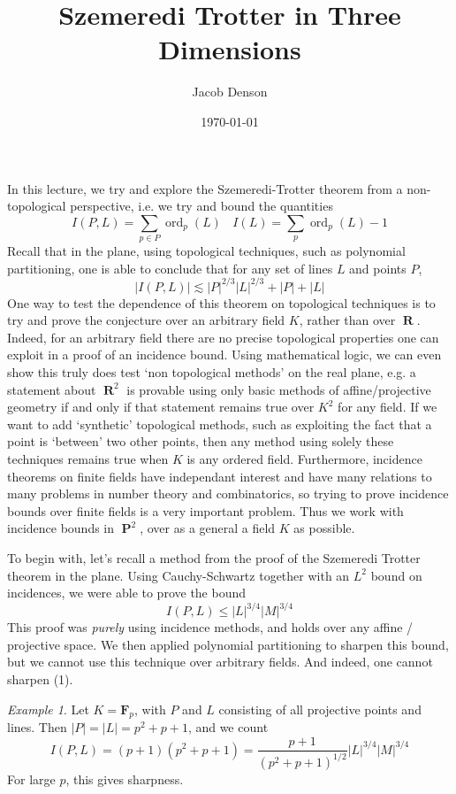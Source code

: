 \documentclass{article}
\title{Szemeredi Trotter in Three Dimensions}
\author{Jacob Denson}
\date{\today}
\theoremstyle{plain}
\theoremstyle{remark}
\newtheorem*{example}{Example}
\theoremstyle{definition}
\DeclareMathOperator{\RR}{\mathbf{R}}
\DeclareMathOperator{\PP}{\mathbf{P}}
\DeclareMathOperator{\ord}{\text{ord}}
\begin{document}
\maketitle

In this lecture, we try and explore the Szemeredi-Trotter theorem from a non-topological perspective, i.e. we try and bound the quantities
%
\[ I(P,L) = \sum_{p \in P} \ord_p(L)\ \ \ \ I(L) = \sum_p \ord_p(L) - 1 \]
%
Recall that in the plane, using topological techniques, such as polynomial partitioning, one is able to conclude that for any set of lines $L$ and points $P$,
%
\[ |I(P,L)| \lesssim |P|^{2/3} |L|^{2/3} + |P| + |L| \]
%
One way to test the dependence of this theorem on topological techniques is to try and prove the conjecture over an arbitrary field $K$, rather than over $\RR$. Indeed, for an arbitrary field there are no precise topological properties one can exploit in a proof of an incidence bound. Using mathematical logic, we can even show this truly does test `non topological methods' on the real plane, e.g. a statement about $\RR^2$ is provable using only basic methods of affine/projective geometry if and only if that statement remains true over $K^2$ for any field. If we want to add `synthetic' topological methods, such as exploiting the fact that a point is `between' two other points, then any method using solely these techniques remains true when $K$ is any ordered field. Furthermore, incidence theorems on finite fields have independant interest and have many relations to many problems in number theory and combinatorics, so trying to prove incidence bounds over finite fields is a very important problem. Thus we work with incidence bounds in $\PP^2$, over as a general a field $K$ as possible.

To begin with, let's recall a method from the proof of the Szemeredi Trotter theorem in the plane. Using Cauchy-Schwartz together with an $L^2$ bound on incidences, we were able to prove the bound
%
\begin{equation} I(P,L) \leq |L|^{3/4} |M|^{3/4} \end{equation}
%
This proof was {\it purely} using incidence methods, and holds over any affine / projective space. We then applied polynomial partitioning to sharpen this bound, but we cannot use this technique over arbitrary fields. And indeed, one cannot sharpen (1).

\begin{example}
    Let $K = \mathbf{F}_p$, with $P$ and $L$ consisting of all projective points and lines. Then $|P| = |L| = p^2 + p+1$, and we count
    \[ I(P,L) = (p+1)(p^2+p+1) = \frac{p+1}{(p^2 + p + 1)^{1/2}} |L|^{3/4} |M|^{3/4} \]
    For large $p$, this gives sharpness.
\end{example}
\end{document}
